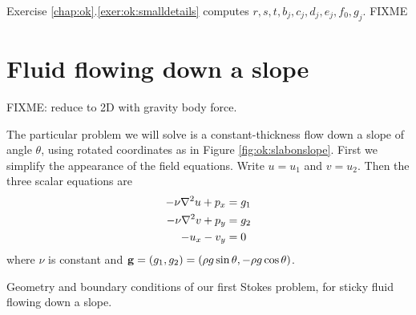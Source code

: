 Exercise \ref{chap:ok}.\ref{exer:ok:smalldetails} computes $r,s,t,b_j,c_j,d_j,e_j,f_0,g_j$.  FIXME






\section{Fluid flowing down a slope}

FIXME: reduce to 2D with gravity body force.

The particular problem we will solve is a constant-thickness flow down a slope of angle $\theta$, using rotated coordinates as in Figure \ref{fig:ok:slabonslope}.  First we simplify the appearance of the field equations.  Write $u=u_1$ and $v=u_2$.  Then the three scalar equations are
\begin{align}
-\nu \nabla^2 u + p_x &= g_1 \label{eq:ok:stokes2du} \\
-\nu \nabla^2 v + p_y &= g_2 \label{eq:ok:stokes2dv} \\
- u_x - v_y &= 0 \label{eq:ok:stokes2dincomp}
\end{align}
where $\nu$ is constant and $\mathbf{g} = (g_1,g_2) = (\rho g \sin \theta, - \rho g \cos \theta)$.

\begin{marginfigure}

\caption{Geometry and boundary conditions of our first Stokes problem, for sticky fluid flowing down a slope.}
\label{fig:ok:slabonslope}
\end{marginfigure}

